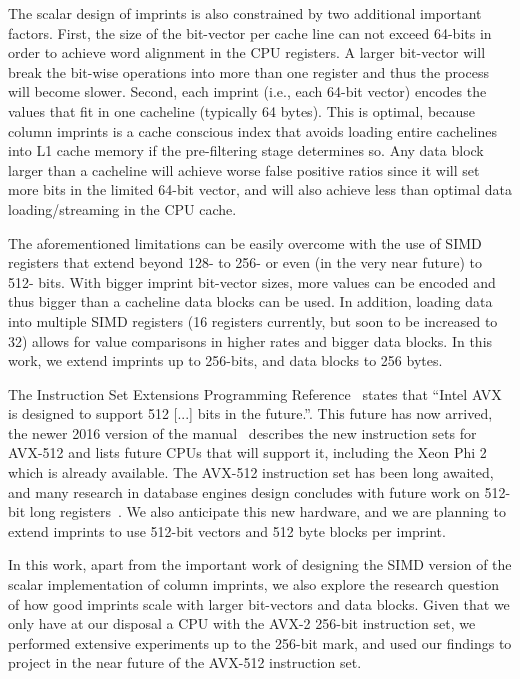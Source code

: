\documentclass[sigconf]{acmart}
\begin{document}
The scalar design of imprints is also constrained by two additional important 
factors. First, the size of the bit-vector per cache line can not exceed 64-bits in 
order to achieve word alignment in the CPU registers. A larger bit-vector will break
the bit-wise operations into more than one register and thus the process will become
slower. Second, each imprint (i.e., each 64-bit vector) encodes the values that fit
in one cacheline (typically 64 bytes). This is optimal, because column imprints is a
cache conscious index that avoids loading entire cachelines into L1 cache memory if 
the pre-filtering stage determines so. Any data block larger than a cacheline will 
achieve worse false positive ratios since it will set more bits in the limited 
64-bit vector, and will also achieve less than optimal data loading/streaming in the
CPU cache.

The aforementioned limitations can be easily overcome with the use of SIMD 
registers that extend beyond 128- to 256- or even (in the very near future) to 512- 
bits. With bigger imprint bit-vector sizes, more values can be encoded and thus 
bigger than a cacheline data blocks can be used. In addition, loading data into 
multiple SIMD registers (16 registers currently, but soon to be increased to 32) 
allows for value comparisons in higher rates and bigger data blocks. In this work, 
we extend imprints up to 256-bits, and data blocks to 256 bytes.  

The Instruction Set Extensions Programming Reference~\cite{IntelManual2011} states that 
``Intel AVX is designed to support 512 [...] bits in the future.''. This future has 
now arrived, the newer 2016 version of the manual~\cite{IntelManual2016} describes 
the new instruction sets for AVX-512 and lists future CPUs that will support 
it, including the Xeon Phi 2 which is already available. The AVX-512 instruction set has been long awaited, and many research in database engines design concludes with 
future work on 512-bit long registers~\cite{DBLP:journals/pvldb/KimSCKNBLSD09}. We 
also anticipate this new hardware, and we are planning to extend imprints to use 
512-bit vectors and 512 byte blocks per imprint.

In this work, apart from the important work of designing the SIMD version of the 
scalar implementation of column imprints, we also explore the research question of
how good imprints scale with larger bit-vectors and data blocks. Given that we only 
have at our disposal a CPU with the AVX-2 256-bit instruction set, we performed 
extensive experiments up to the 256-bit mark, and used our findings to project in the 
near future of the AVX-512 instruction set.
\end{document}
